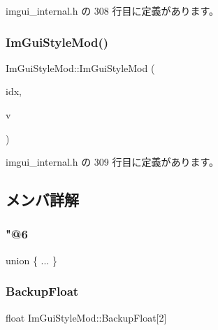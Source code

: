  imgui\+\_\+internal.\+h の 308 行目に定義があります。

\mbox{\label{struct_im_gui_style_mod_a28647cc4ab8b95b8ee30e0fc7401ae07}} 
\subsubsection{\texorpdfstring{Im\+Gui\+Style\+Mod()}{ImGuiStyleMod()}\hspace{0.1cm}{\footnotesize\ttfamily [3/3]}}
{\footnotesize\ttfamily Im\+Gui\+Style\+Mod\+::\+Im\+Gui\+Style\+Mod (\begin{DoxyParamCaption}\item[{\mbox{\hyperlink{imgui_8h_ac919acabce24faae590e295b424874ca}{Im\+Gui\+Style\+Var}}}]{idx,  }\item[{\mbox{\hyperlink{struct_im_vec2}{Im\+Vec2}}}]{v }\end{DoxyParamCaption})\hspace{0.3cm}{\ttfamily [inline]}}



 imgui\+\_\+internal.\+h の 309 行目に定義があります。



\subsection{メンバ詳解}
\mbox{\label{struct_im_gui_style_mod_a4307f70f6364de07cba9fee7523fe2b6}} 
\subsubsection{\texorpdfstring{"@6}{@6}}
{\footnotesize\ttfamily union \{ ... \} }

\mbox{\label{struct_im_gui_style_mod_af36b5cf1100de970d78a53db937be949}} 
\subsubsection{\texorpdfstring{Backup\+Float}{BackupFloat}}
{\footnotesize\ttfamily float Im\+Gui\+Style\+Mod\+::\+Backup\+Float\mbox{[}2\mbox{]}}



